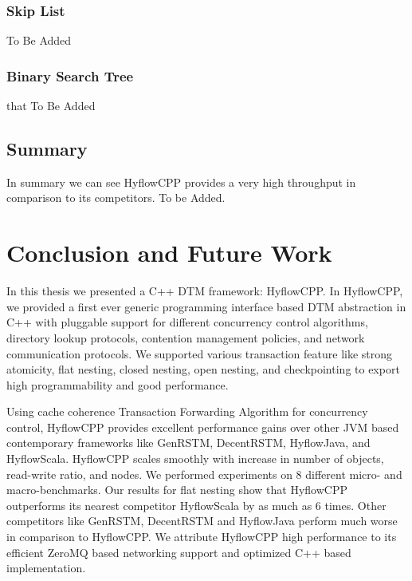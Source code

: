 \documentclass[12pt,english]{report}
\begin{document}
\subsection{Skip List}

To Be Added 

\subsection{Binary Search Tree}
that
To Be Added

\section{Summary}

In summary we can see HyflowCPP provides a very high throughput in comparison to its competitors.
To be Added.

\chapter{Conclusion and Future Work}\label{chap:conclusion}

In this thesis we presented a C++ DTM framework: HyflowCPP. In HyflowCPP, we provided a first ever generic programming interface based DTM abstraction in C++ with pluggable support for different concurrency control algorithms, directory lookup protocols, contention management policies, and network communication protocols.
We supported various transaction feature like strong atomicity, flat nesting, closed nesting, open nesting, and checkpointing to export high programmability and good performance.

Using cache coherence Transaction Forwarding Algorithm for concurrency control, HyflowCPP provides excellent performance gains over other JVM based contemporary frameworks like GenRSTM, DecentRSTM, HyflowJava, and HyflowScala. HyflowCPP scales smoothly with increase in number of objects, read-write ratio, and nodes. We performed experiments on 8 different micro- and macro-benchmarks. Our results for flat nesting show that HyflowCPP outperforms its nearest competitor HyflowScala by as much as 6 times. Other competitors like GenRSTM, DecentRSTM and HyflowJava perform much worse in comparison to HyflowCPP. We attribute HyflowCPP high performance to its efficient ZeroMQ based networking support and optimized C++ based implementation. 
\end{document}
